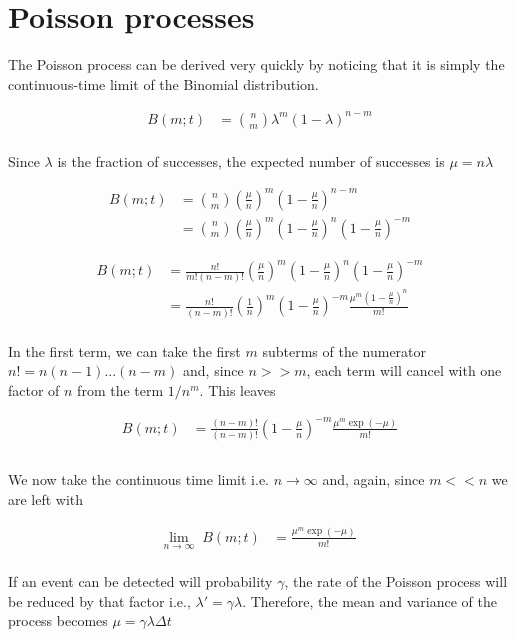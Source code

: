 \documentclass{ucetd}
\begin{document}
\section{Poisson processes}

The Poisson process can be derived very quickly by noticing that it is simply the continuous-time limit of the Binomial distribution.

\begin{align*}
B(m;t) &= {n\choose m}\lambda^{m}(1-\lambda)^{n-m}\\
\end{align*}

Since $\lambda$ is the fraction of successes, the expected number of successes is $\mu = n\lambda$

\begin{align*}
B(m;t) &=  {n\choose m}\left(\frac{\mu}{n}\right)^{m}\left(1-\frac{\mu}{n}\right)^{n-m}\\
&= {n\choose m}\left(\frac{\mu}{n}\right)^{m}\left(1-\frac{\mu}{n}\right)^{n}\left(1-\frac{\mu}{n}\right)^{-m}
\end{align*}

\begin{align*}
B(m;t) &= \frac{n!}{m!(n-m)!}\left(\frac{\mu}{n}\right)^{m}\left(1-\frac{\mu}{n}\right)^{n}\left(1-\frac{\mu}{n}\right)^{-m}\\
&= \frac{n!}{(n-m)!}\left(\frac{1}{n}\right)^{m}\left(1-\frac{\mu}{n}\right)^{-m}\frac{\mu^{m}\left(1-\frac{\mu}{n}\right)^{n}}{m!}\\
\end{align*}

In the first term, we can take the first $m$ subterms of the numerator $n! = n(n-1)...(n-m)$ and, since $n>>m$, each term will cancel with one factor of $n$ from the term $1/n^{m}$. This leaves

\begin{align*}
B(m;t) &= \frac{(n-m)!}{(n-m)!}\left(1-\frac{\mu}{n}\right)^{-m}\frac{\mu^{m}\exp(-\mu)}{m!}\\\\
\end{align*}

We now take the continuous time limit i.e. $n\rightarrow\infty$ and, again, since $m << n$ we are left with 

\begin{align*}
\underset{n\rightarrow\infty}{\mathrm{lim}} \;\; B(m;t) &= \frac{\mu^{m}\exp(-\mu)}{m!}\\
\end{align*}

If an event can be detected will probability $\gamma$, the rate of the Poisson process will be reduced by that factor i.e., $\lambda' = \gamma\lambda$. Therefore, the mean and variance of the process becomes $\mu = \gamma\lambda\Delta t$
\end{document}
